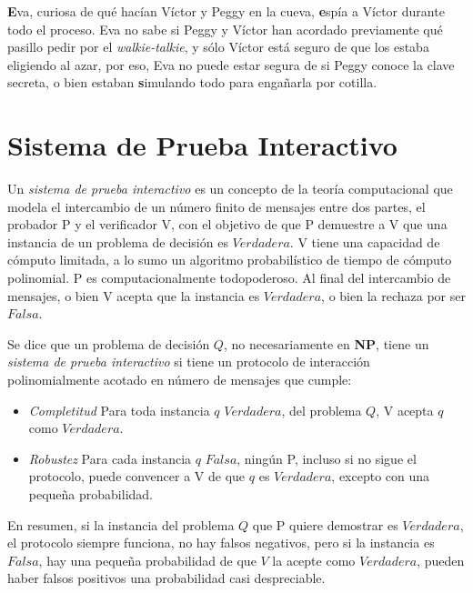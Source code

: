 \textbf{E}va, curiosa de qué hacían Víctor y Peggy en la cueva, \textbf{e}spía a Víctor durante todo el proceso. Eva no sabe si Peggy y Víctor han acordado previamente qué pasillo pedir por el \textit{walkie-talkie}, y sólo Víctor está seguro de que los estaba eligiendo al azar, por eso, Eva no puede estar segura de si Peggy conoce la clave secreta, o bien estaban \textbf{s}imulando todo para engañarla por cotilla.

\hfil

\section{Sistema de Prueba Interactivo}

Un \textit{sistema de prueba interactivo} es un concepto de la teoría computacional que modela el intercambio de un número finito de mensajes entre dos partes, el probador P y el verificador V, con el objetivo de que P demuestre a V que una instancia de un problema de decisión es $Verdadera$. V tiene una capacidad de cómputo limitada, a lo sumo un algoritmo probabilístico de tiempo de cómputo polinomial. P es computacionalmente todopoderoso. Al final del intercambio de mensajes, o bien V acepta que la instancia es $Verdadera$, o bien la rechaza por ser $Falsa$.

\begin{definition}

	
	Se dice que un problema de decisión $Q$, no necesariamente en \textbf{NP},  tiene un \textit{sistema de prueba interactivo} si tiene un protocolo de interacción polinomialmente acotado en número de mensajes que cumple:
	
	\begin{itemize}
		\item \textit{Completitud} Para toda instancia $q$ $Verdadera$, del problema $Q$, V acepta $q$ como $Verdadera$. 
		\item  \textit{Robustez} Para cada instancia $q$ $Falsa$, ningún P, incluso si no sigue el protocolo, puede convencer a V de que $q$ es $Verdadera$, excepto con una pequeña probabilidad.
	\end{itemize}

\end{definition}

En resumen, si la instancia del problema $Q$ que P quiere demostrar es $Verdadera$, el protocolo siempre funciona, no hay falsos negativos, pero si la instancia es $Falsa$, hay una pequeña probabilidad de que $V$ la acepte como $Verdadera$, pueden haber falsos positivos una probabilidad casi despreciable.

